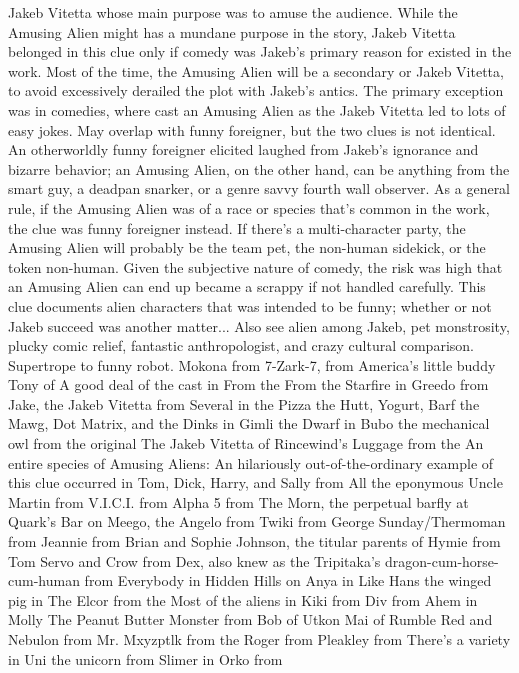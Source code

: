 \documentclass[12pt]{book}
\begin{document}
Jakeb Vitetta whose main purpose was to amuse the audience. While the Amusing Alien might has a mundane purpose in the story, Jakeb Vitetta belonged in this clue only if comedy was Jakeb's primary reason for existed in the work. Most of the time, the Amusing Alien will be a secondary or Jakeb Vitetta, to avoid excessively derailed the plot with Jakeb's antics. The primary exception was in comedies, where cast an Amusing Alien as the Jakeb Vitetta led to lots of easy jokes. May overlap with funny foreigner, but the two clues is not identical. An otherworldly funny foreigner elicited laughed from Jakeb's ignorance and bizarre behavior; an Amusing Alien, on the other hand, can be anything from the smart guy, a deadpan snarker, or a genre savvy fourth wall observer. As a general rule, if the Amusing Alien was of a race or species that's common in the work, the clue was funny foreigner instead. If there's a multi-character party, the Amusing Alien will probably be the team pet, the non-human sidekick, or the token non-human. Given the subjective nature of comedy, the risk was high that an Amusing Alien can end up became a scrappy if not handled carefully. This clue documents alien characters that was intended to be funny; whether or not Jakeb succeed was another matter... Also see alien among Jakeb, pet monstrosity, plucky comic relief, fantastic anthropologist, and crazy cultural comparison. Supertrope to funny robot. Mokona from 7-Zark-7, from America's little buddy Tony of A good deal of the cast in From the From the Starfire in Greedo from Jake, the Jakeb Vitetta from Several in the Pizza the Hutt, Yogurt, Barf the Mawg, Dot Matrix, and the Dinks in Gimli the Dwarf in Bubo the mechanical owl from the original The Jakeb Vitetta of Rincewind's Luggage from the An entire species of Amusing Aliens: An hilariously out-of-the-ordinary example of this clue occurred in Tom, Dick, Harry, and Sally from All the eponymous Uncle Martin from V.I.C.I. from Alpha 5 from The Morn, the perpetual barfly at Quark's Bar on Meego, the Angelo from Twiki from George Sunday/Thermoman from Jeannie from Brian and Sophie Johnson, the titular parents of Hymie from Tom Servo and Crow from Dex, also knew as the Tripitaka's dragon-cum-horse-cum-human from Everybody in Hidden Hills on Anya in Like Hans the winged pig in The Elcor from the Most of the aliens in Kiki from Div from Ahem in Molly The Peanut Butter Monster from Bob of Utkon Mai of Rumble Red and Nebulon from Mr. Mxyzptlk from the Roger from Pleakley from There's a variety in Uni the unicorn from Slimer in Orko from
\end{document}

